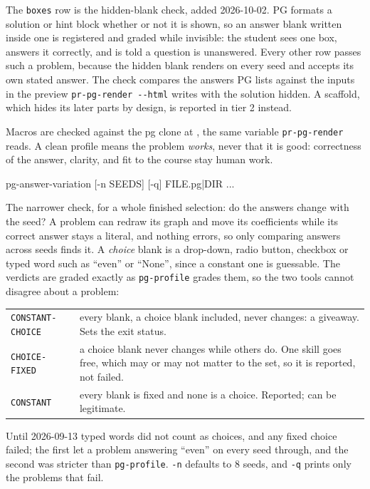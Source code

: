 The \texttt{boxes} row is the hidden-blank check, added 2026-10-02.
PG formats a solution or hint block whether or not it is shown, so an answer blank written inside one is registered and graded while invisible: the student sees one box, answers it correctly, and is told a question is unanswered.
Every other row passes such a problem, because the hidden blank renders on every seed and accepts its own stated answer.
The check compares the answers PG lists against the inputs in the preview \texttt{pr-pg-render -{}-html} writes with the solution hidden.
A scaffold, which hides its later parts by design, is reported in tier 2 instead.

Macros are checked against the pg clone at , the same variable \texttt{pr-pg-render} reads.
A clean profile means the problem \emph{works}, never that it is good: correctness of the answer, clarity, and fit to the course stay human work.

\begin{manexsource}
pg-answer-variation [-n SEEDS] [-q] FILE.pg|DIR ...
\end{manexsource}

The narrower check, for a whole finished selection: do the answers change with the seed?
A problem can redraw its graph and move its coefficients while its correct answer stays a literal, and nothing errors, so only comparing answers across seeds finds it.
A \emph{choice} blank is a drop-down, radio button, checkbox or typed word such as ``even'' or ``None'', since a constant one is guessable.
The verdicts are graded exactly as \texttt{pg-profile} grades them, so the two tools cannot disagree about a problem:

\begin{center}
\begin{tabularx}{\linewidth}{@{}l Y@{}}
\texttt{CONSTANT-CHOICE} & every blank, a choice blank included, never
  changes: a giveaway. Sets the exit status.\\
\texttt{CHOICE-FIXED} & a choice blank never changes while others do. One
  skill goes free, which may or may not matter to the set, so it is reported,
  not failed.\\
\texttt{CONSTANT} & every blank is fixed and none is a choice. Reported; can
  be legitimate.\\
\end{tabularx}
\end{center}

Until 2026-09-13 typed words did not count as choices, and any fixed choice failed; the first let a problem answering ``even'' on every seed through, and the second was stricter than \texttt{pg-profile}.
\texttt{-n} defaults to 8 seeds, and \texttt{-q} prints only the problems that fail.

